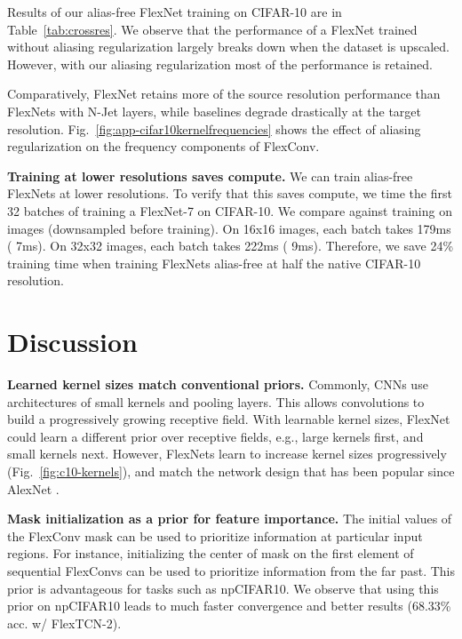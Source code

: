 \documentclass{article} \usepackage{iclr2022_conference,times}
\begin{document}
Results of our alias-free FlexNet training on CIFAR-10 are in Table~\ref{tab:crossres}. We observe that the performance of a FlexNet trained without aliasing regularization largely breaks down when the dataset is upscaled. 
However, with our aliasing regularization most of the performance is retained. 

Comparatively, FlexNet retains more of the source resolution performance than FlexNets with N-Jet layers, while baselines degrade drastically at the target resolution. Fig.~\ref{fig:app-cifar10kernelfrequencies} shows the effect of aliasing regularization on the frequency components of FlexConv.

\textbf{Training at lower resolutions saves compute.} We can train alias-free FlexNets at lower resolutions. To verify that this saves compute, we time the first 32 batches of training a FlexNet-7 on CIFAR-10. We compare against training on  images (downsampled before training). On 16x16 images, each batch takes 179ms ( 7ms). On 32x32 images, each batch takes 222ms ( 9ms). Therefore, we save 24\% training time when training FlexNets alias-free at half the native CIFAR-10 resolution.
\vspace{-2mm}
\section{Discussion}
\label{sec:discussion}
\vspace{-2mm}
\textbf{Learned kernel sizes match conventional priors.} Commonly, CNNs use architectures of small kernels and pooling layers. This allows convolutions to build a progressively growing receptive field. With learnable kernel sizes, FlexNet could learn a different prior over receptive fields, e.g., large kernels first, and small kernels next. However, FlexNets learn to increase kernel sizes progressively (Fig.~\ref{fig:c10-kernels}), and match the network design that has been popular since AlexNet \citep{krizhevsky_imagenet_2012}.

\textbf{Mask initialization as a prior for feature importance.} The initial values of the FlexConv mask can be used to prioritize information at particular input regions. For instance, initializing the center of mask on the first element of sequential FlexConvs can be used to prioritize information from the far past. This prior is advantageous for tasks such as npCIFAR10. We observe that using this prior on npCIFAR10 leads to much faster convergence and better results (68.33\% acc. w/ FlexTCN-2).
\end{document}
